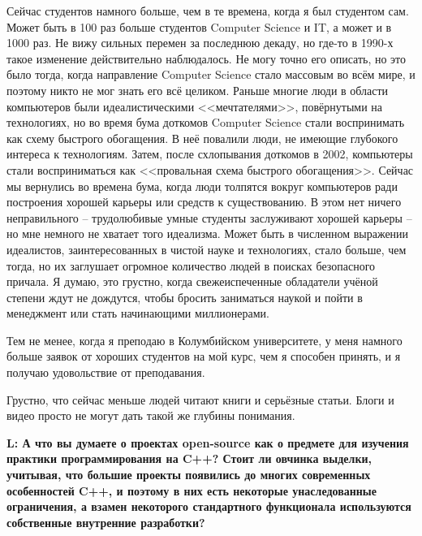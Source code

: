\documentclass[10pt, a5paper]{article}
\begin{document}
\begin{Parallel}[p]{}{}
{Сейчас студентов намного больше, чем в те времена, когда я был студентом сам. Может быть в 100 раз больше студентов Computer Science и IT, а может и в 1000 раз. Не вижу сильных перемен за последнюю декаду, но где-то в 1990-х такое изменение действительно наблюдалось. Не могу точно его описать, но это было тогда, когда направление Computer Science стало массовым во всём мире, и поэтому никто не мог знать его всё целиком. Раньше многие люди в области компьютеров были идеалистическими <<мечтателями>>, повёрнутыми на технологиях, но во время бума доткомов Computer Science стали воспринимать как схему быстрого обогащения. В неё повалили люди, не имеющие глубокого интереса к технологиям. Затем, после схлопывания доткомов в 2002, компьютеры стали восприниматься как <<провальная схема быстрого обогащения>>. Сейчас мы вернулись во времена бума, когда люди толпятся вокруг компьютеров ради построения хорошей карьеры или средств к существованию. В этом нет ничего неправильного – трудолюбивые умные студенты заслуживают хорошей карьеры – но мне немного не хватает того идеализма. Может быть в численном выражении идеалистов, заинтересованных в чистой науке и технологиях, стало больше, чем тогда, но их заглушает огромное количество людей в поисках безопасного причала. Я думаю, это грустно, когда свежеиспеченные обладатели учёной степени ждут не дождутся, чтобы бросить заниматься наукой и пойти в менеджмент или стать начинающими миллионерами.

Тем не менее, когда я преподаю в Колумбийском университете, у меня намного больше заявок от хороших студентов на мой курс, чем я способен принять, и я получаю удовольствие от преподавания.

Грустно, что сейчас меньше людей читают книги и серьёзные статьи. Блоги и видео просто не могут дать такой же глубины понимания.

{\noindent \bf L: А что вы думаете о проектах open-source как о предмете для изучения практики программирования на C++? Стоит ли овчинка выделки, учитывая, что большие проекты появились до многих современных особенностей C++, и поэтому в них есть некоторые унаследованные ограничения, а взамен некоторого стандартного функционала используются собственные внутренние разработки?}

}
\end{Parallel}
\end{document}
